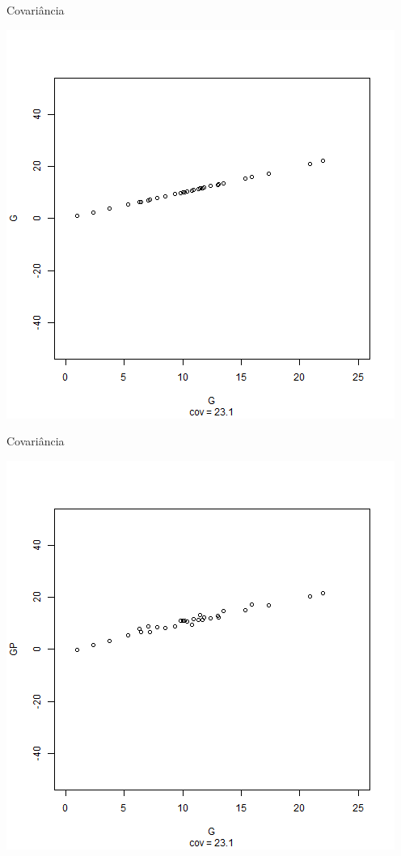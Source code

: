 \documentclass{beamer}
\begin{document}
\begin{frame}{Covariância}
  \begin{center}
    \includegraphics[height=.8\textheight]{Cap17/anim-0}
  \end{center}
\end{frame}

\begin{frame}{Covariância}
  \begin{center}
    \includegraphics[height=.8\textheight]{Cap17/anim-1}
  \end{center}
\end{frame}
\end{document}
